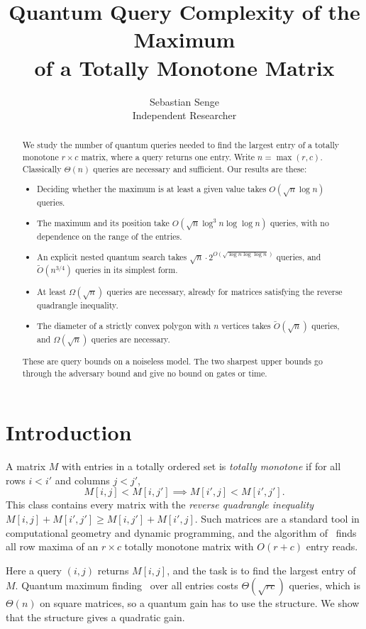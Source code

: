 \documentclass[11pt]{article}
\title{Quantum Query Complexity of the Maximum\\ of a Totally Monotone Matrix}
\author{Sebastian Senge\\ Independent Researcher}
\date{}
\theoremstyle{definition}
\theoremstyle{remark}
\newcommand{\Ot}{\tilde O}
\begin{document}
\maketitle

\begin{abstract}
We study the number of quantum queries needed to find the largest entry of a totally monotone $r\times c$ matrix, where a query returns one entry. Write $n=\max(r,c)$. Classically $\Theta(n)$ queries are necessary and sufficient. Our results are these:
\begin{itemize}[leftmargin=1.5em]
\item Deciding whether the maximum is at least a given value takes $O(\sqrt n\log n)$ queries.
\item The maximum and its position take $O(\sqrt n\log^3 n\log\log n)$ queries, with no dependence on the range of the entries.
\item An explicit nested quantum search takes $\sqrt n\cdot 2^{O(\sqrt{\log n\log\log n})}$ queries, and $\Ot(n^{3/4})$ queries in its simplest form.
\item At least $\Omega(\sqrt n)$ queries are necessary, already for matrices satisfying the reverse quadrangle inequality.
\item The diameter of a strictly convex polygon with $n$ vertices takes $\Ot(\sqrt n)$ queries, and $\Omega(\sqrt n)$ queries are necessary.
\end{itemize}
These are query bounds on a noiseless model. The two sharpest upper bounds go through the adversary bound and give no bound on gates or time.
\end{abstract}

\section{Introduction}

A matrix $M$ with entries in a totally ordered set is \emph{totally monotone} if for all rows $i<i'$ and columns $j<j'$,
\[
M[i,j]<M[i,j'] \implies M[i',j]<M[i',j'].
\]
This class contains every matrix with the \emph{reverse quadrangle inequality} $M[i,j]+M[i',j']\ge M[i,j']+M[i',j]$. Such matrices are a standard tool in computational geometry and dynamic programming, and the algorithm of~\cite{AKMSW87} finds all row maxima of an $r\times c$ totally monotone matrix with $O(r+c)$ entry reads.

Here a query $(i,j)$ returns $M[i,j]$, and the task is to find the largest entry of $M$. Quantum maximum finding~\cite{DH96} over all entries costs $\Theta(\sqrt{rc})$ queries, which is $\Theta(n)$ on square matrices, so a quantum gain has to use the structure. We show that the structure gives a quadratic gain.
\end{document}
